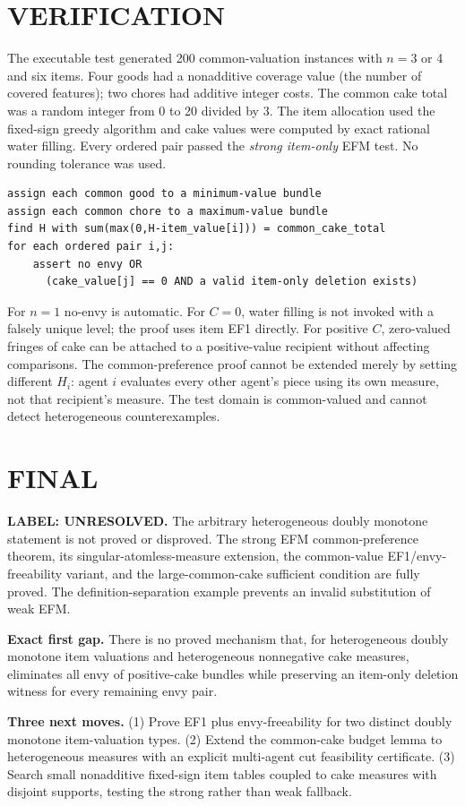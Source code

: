 \documentclass[11pt,a4paper]{article}
\theoremstyle{remark}\newtheorem{remark}[theorem]{Remark}
\begin{document}
\section{VERIFICATION}
The executable test generated 200 common-valuation instances with $n=3$ or 4 and six items. Four goods had a nonadditive coverage value (the number of covered features); two chores had additive integer costs. The common cake total was a random integer from 0 to 20 divided by 3. The item allocation used the fixed-sign greedy algorithm and cake values were computed by exact rational water filling. Every ordered pair passed the \emph{strong item-only} EFM test. No rounding tolerance was used.
\begin{lstlisting}
assign each common good to a minimum-value bundle
assign each common chore to a maximum-value bundle
find H with sum(max(0,H-item_value[i])) = common_cake_total
for each ordered pair i,j:
    assert no envy OR
      (cake_value[j] == 0 AND a valid item-only deletion exists)
\end{lstlisting}
For $n=1$ no-envy is automatic. For $C=0$, water filling is not invoked with a falsely unique level; the proof uses item EF1 directly. For positive $C$, zero-valued fringes of cake can be attached to a positive-value recipient without affecting comparisons. The common-preference proof cannot be extended merely by setting different $H_i$: agent $i$ evaluates every other agent's piece using its own measure, not that recipient's measure. The test domain is common-valued and cannot detect heterogeneous counterexamples.

\section{FINAL}
\textbf{LABEL: UNRESOLVED.}
The arbitrary heterogeneous doubly monotone statement is not proved or disproved. The strong EFM common-preference theorem, its singular-atomless-measure extension, the common-value EF1/envy-freeability variant, and the large-common-cake sufficient condition are fully proved. The definition-separation example prevents an invalid substitution of weak EFM.

\textbf{Exact first gap.} There is no proved mechanism that, for heterogeneous doubly monotone item valuations and heterogeneous nonnegative cake measures, eliminates all envy of positive-cake bundles while preserving an item-only deletion witness for every remaining envy pair.

\textbf{Three next moves.} (1) Prove EF1 plus envy-freeability for two distinct doubly monotone item-valuation types. (2) Extend the common-cake budget lemma to heterogeneous measures with an explicit multi-agent cut feasibility certificate. (3) Search small nonadditive fixed-sign item tables coupled to cake measures with disjoint supports, testing the strong rather than weak fallback.
\end{document}

